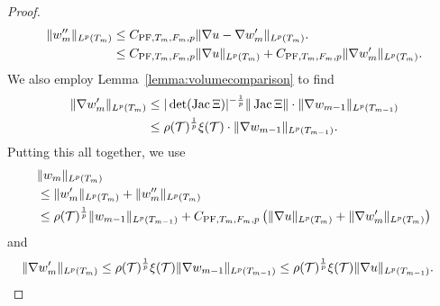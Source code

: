 \documentclass[10pt,letterpaper]{article}
\begin{document}
\begin{proof}
\begin{align*}
        \| w''_{m} \|_{L^{p}(T_{m})} 
        &
        \leq 
        C_{{\rm PF},T_{m},F_{m},p} \| \nabla u - \nabla w'_{m} \|_{L^{p}(T_{m})}.
        \\&
        \leq 
        C_{{\rm PF},T_{m},F_{m},p} \| \nabla u      \|_{L^{p}(T_{m})} 
        + 
        C_{{\rm PF},T_{m},F_{m},p} \| \nabla w'_{m} \|_{L^{p}(T_{m})} 
        .
    \end{align*}
    We also employ Lemma~\ref{lemma:volumecomparison} to find 
    \begin{align*}
        \| \nabla w'_{m} \|_{L^{p}(T_{m})}
        &
        \leq 
        |\det(\operatorname{{\rm Jac}} \Xi  )|^{-\frac 1 p} 
        \| \operatorname{{\rm Jac}} \Xi   \|
        \cdot 
        \| \nabla w_{m-1} \|_{L^{p}(T_{m-1})}
        \\&
        \leq 
        \rho({\mathcal T})^{\frac 1 p} \xi({\mathcal T})
        \cdot 
        \| \nabla w_{m-1} \|_{L^{p}(T_{m-1})}
        .
    \end{align*}
    Putting this all together, we use 
    \begin{align*}
        &
        \| w_{m} \|_{L^{p}(T_{m})}
        \\&
        \leq  
        \| w'_{m} \|_{L^{p}(T_{m})}
        + 
        \| w''_{m} \|_{L^{p}(T_{m})}
        \\&
        \leq  
        \rho({\mathcal T})^{\frac 1 p} 
        \| w_{m-1} \|_{L^{p}(T_{m-1})} 
        + 
        C_{{\rm PF},T_{m},F_{m},p} 
        \left( 
            \| \nabla u \|_{L^{p}(T_{m})} 
            + 
            \| \nabla w'_{m} \|_{L^{p}(T_{m})} 
        \right) 
    \end{align*}
    and 
    \begin{align*}
        \| \nabla w'_{m} \|_{L^{p}(T_{m})} 
        &
        \leq  
        \rho({\mathcal T})^{\frac 1 p} \xi({\mathcal T})
        \| \nabla w_{m-1} \|_{L^{p}(T_{m-1})} 
        \leq  
        \rho({\mathcal T})^{\frac 1 p} \xi({\mathcal T})
        \| \nabla u \|_{L^{p}(T_{m-1})} 
        .
    \end{align*}

\end{proof}
\end{document}
